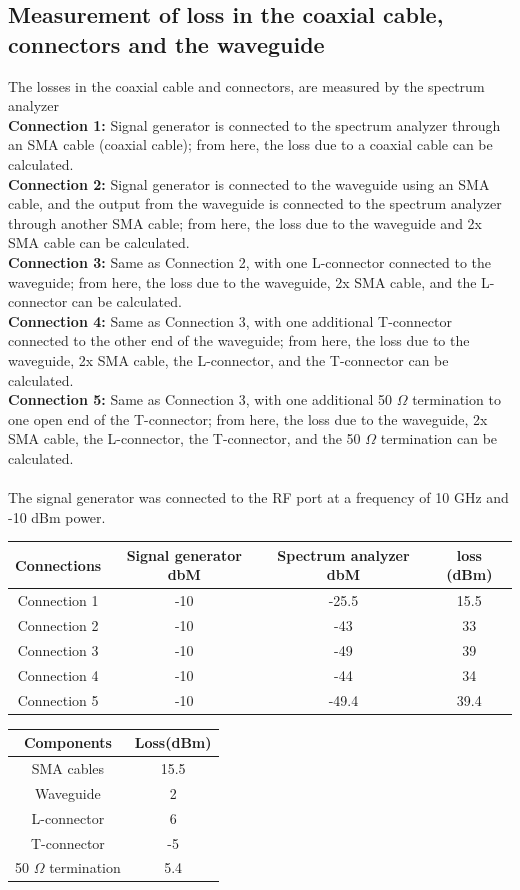 \documentclass[12pt,a4paper,bold]{thesis}
\theoremstyle{thm}
\theoremstyle{definition}
\begin{document}
\subsection{Measurement of loss in the coaxial cable, connectors and the waveguide}
The losses in the coaxial cable and connectors, are measured by the spectrum analyzer\\
\textbf{Connection 1:} Signal generator is connected to the spectrum analyzer through an SMA cable (coaxial cable); from here, the loss due to a coaxial cable can be calculated.\\
\textbf{Connection 2:} Signal generator is connected to the waveguide using an SMA cable, and the output from the waveguide is connected to the spectrum analyzer through another SMA cable; from here, the loss due to the waveguide and 2x SMA cable can be calculated.\\ 
\textbf{Connection 3:} Same as Connection 2, with one L-connector connected to the waveguide; from here, the loss due to the waveguide, 2x SMA cable, and the L-connector can be calculated.\\
\textbf{Connection 4:} Same as Connection 3, with one additional T-connector connected to the other end of the waveguide; from here, the loss due to the waveguide, 2x SMA cable, the L-connector, and the T-connector can be calculated.\\
\textbf{Connection 5:} Same as Connection 3, with one additional 50 $\Omega$ termination to one open end of the  T-connector; from here, the loss due to the waveguide, 2x SMA cable, the L-connector, the T-connector, and the 50 $\Omega$ termination can be calculated.\\\\
The signal generator was connected to the RF port at a frequency of 10 GHz and -10 dBm power.
\begin{center}
\begin{tabular}{||c c c c||} 
 \hline
 Connections & Signal generator dbM & Spectrum analyzer dbM & loss (dBm)\\ [0.5ex] 
 \hline\hline
 Connection 1 & -10 & -25.5 & 15.5\\ 
 Connection 2 & -10 & -43 & 33\\
 Connection 3 & -10 & -49 & 39\\
 Connection 4 & -10 & -44 & 34\\
 Connection 5 & -10 & -49.4 & 39.4\\  [1ex] 
 \hline
\end{tabular}
\end{center}
\begin{center}
\begin{tabular}{||c c||} 
 \hline
 Components & Loss(dBm) \\ [0.5ex] 
 \hline\hline
 SMA cables & 15.5 \\ 
 Waveguide & 2 \\
 L-connector & 6 \\
 T-connector & -5 \\
 50 $\Omega$ termination & 5.4 \\  [1ex] 
 \hline
\end{tabular}
\end{center}
\end{document}
